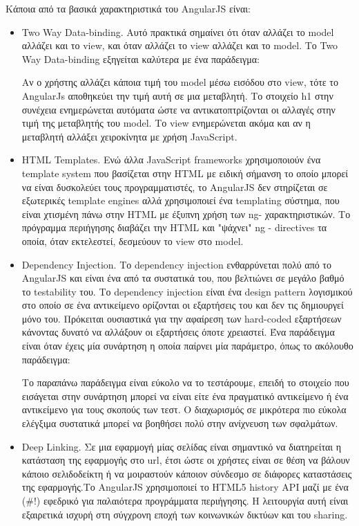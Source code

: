 	Κάποια από τα βασικά χαρακτηριστικά του AngularJS είναι:
	\begin{itemize}
	\item Two Way Data-binding. Αυτό πρακτικά σημαίνει ότι όταν αλλάζει το model αλλάζει και το view, και όταν αλλάζει το  view αλλάζει και το model.  Το Two Way Data-binding εξηγείται καλύτερα με ένα παράδειγμα: 
	
	
	

	Αν ο χρήστης αλλάζει κάποια τιμή του model μέσω εισόδου στο view, τότε το AngularJs αποθηκεύει την τιμή
αυτή σε μια μεταβλητή. Το στοιχείο h1 στην συνέχεια ενημερώνεται αυτόματα ώστε να αντικατοπτρίζονται οι αλλαγές στην τιμή της μεταβλητής του model. Το view ενημερώνεται ακόμα και αν η μεταβλητή αλλάξει χειροκίνητα με χρήση JavaScript.\cite{angular}

	\item  HTML Templates. Ενώ άλλα JavaScript frameworks χρησιμοποιούν ένα template system που βασίζεται στην HTML με ειδική σήμανση το οποίο μπορεί να είναι δυσκολεύει τους προγραμματιστές, το AngularJS δεν στηρίζεται σε εξωτερικές template engines αλλά χρησιμοποιεί ένα templating σύστημα, που είναι χτισμένη πάνω στην HTML με έξυπνη χρήση των ng- χαρακτηριστικών. Το πρόγραμμα περιήγησης διαβάζει την HTML και "ψάχνει"  ng - directives τα οποία, όταν εκτελεστεί, δεσμεύουν το view στο model.

    \item Dependency Injection. Το dependency injection ενθαρρύνεται πολύ από το AngularJS και είναι ένα από τα συστατικά του, που βελτιώνει σε μεγάλο βαθμό το testability του. Το dependency injection είναι ένα design pattern λογισμικού στο οποίο σε ένα αντικείμενο ορίζονται οι εξαρτήσεις του και δεν τις δημιουργεί μόνο του. Πρόκειται ουσιαστικά για την αφαίρεση των hard-coded εξαρτήσεων κάνοντας δυνατό να αλλάξουν οι εξαρτήσεις όποτε χρειαστεί.
      Ένα παράδειγμα είναι όταν έχεις μία συνάρτηση η οποία παίρνει μία παράμετρο, όπως το ακόλουθο παράδειγμα:
    	
	

Το παραπάνω παράδειγμα είναι εύκολο να το τεστάρουμε, επειδή το στοιχείο που εισάγεται στην συνάρτηση μπορεί να είναι είτε ένα πραγματικό αντικείμενο ή ένα αντικείμενο για τους σκοπούς των τεστ. Ο διαχωρισμός σε μικρότερα πιο εύκολα ελέγξιμα συστατικά μπορεί να βοηθήσει πολύ στην ανίχνευση των σφαλμάτων.

    \item Deep Linking. Σε μια εφαρμογή μίας σελίδας είναι σημαντικό να διατηρείται η κατάσταση της εφαρμογής στο url, έτσι ώστε οι χρήστες είναι σε θέση να βάλουν κάποιο σελιδοδείκτη ή να μοιραστούν κάποιον σύνδεσμο σε διάφορες καταστάσεις της εφαρμογής.Το AngularJS χρησιμοποιεί το HTML5 history API  μαζί με ένα (\#!) εφεδρικό για παλαιότερα προγράμματα περιήγησης. Η λειτουργία αυτή είναι εξαιρετικά ισχυρή στη σύγχρονη εποχή των κοινωνικών δικτύων και του sharing.


\end{itemize}
